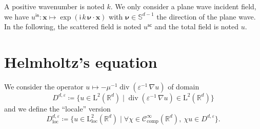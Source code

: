\documentclass[12pt,a4paper]{article}
\newcommand{\bbR}{\mathbb{R}}
\newcommand{\bbS}{\mathbb{S}}
\newcommand{\scrC}{\mathscr{C}}
\newcommand{\rmL}{\mathrm{L}}
\newcommand{\im}{\mathsf{i}}
\DeclareMathOperator{\Div}{div}
\newcommand{\vect}[1]{\boldsymbol{#1}}
\newcommand{\vx}{\boldsymbol{x}}
\newcommand{\eps}{\varepsilon}
\newcommand{\comp}{\mathrm{comp}}
\newcommand{\loc}{\mathrm{loc}}
\newcommand{\inc}{\mathsf{in}}
\newcommand{\sca}{\mathsf{sc}}
\begin{document}
\bigskip

A positive wavenumber is noted $k$.
We only consider a plane wave incident field, we have $u^\inc : \vx \mapsto \exp(\im\, k\, \vect{\nu} \cdot \vx)$ with $\vect{\nu} \in \bbS^{d-1}$ the direction of the plane wave.
In the following, the scattered field is noted $u^\sca$ and the total field is noted $u$.

\section{Helmholtz's equation}

We consider the operator $u \mapsto -\mu^{-1}\Div(\eps^{-1}\, \nabla u)$ of domain
\[
    D^{d, \eps} \coloneqq \{u \in \rmL^2(\bbR^d) \mid \Div(\eps^{-1}\, \nabla u) \in \rmL^2(\bbR^d)\}
\]
and we define the ``locale'' version
\[
    D_\loc^{d, \eps} \coloneqq \{u \in \rmL_\loc^2(\bbR^d) \mid \forall \chi \in \scrC_\comp^\infty(\bbR^d),\ \chi u \in D^{d, \eps}\}.
\]

\bigskip
\end{document}

